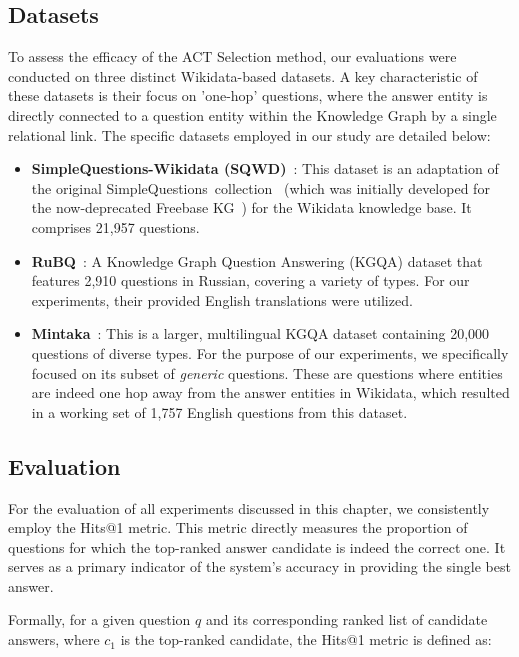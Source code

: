 \subsection{Datasets}
To assess the efficacy of the ACT Selection method, our evaluations were conducted on three distinct Wikidata-based datasets. A key characteristic of these datasets is their focus on 'one-hop' questions, where the answer entity is directly connected to a question entity within the Knowledge Graph by a single relational link. The specific datasets employed in our study are detailed below:
\begin{itemize}
    \item \textbf{SimpleQuestions-Wikidata (SQWD)}~\cite{SQ_WD}: This dataset is an adaptation of the original SimpleQuestions~collection~\cite{simplequestions} (which was initially developed for the now-deprecated Freebase KG~\cite{bollacker2008freebase}) for the Wikidata knowledge base. It comprises 21,957 questions.
    \item \textbf{RuBQ}~\cite{korablinov2020rubq,rybin2021rubq}: A Knowledge Graph Question Answering (KGQA) dataset that features 2,910 questions in Russian, covering a variety of types. For our experiments, their provided English translations were utilized.
    \item \textbf{Mintaka}~\cite{DBLP:conf/coling/SenAS22-mintaka}: This is a larger, multilingual KGQA dataset containing 20,000 questions of diverse types. For the purpose of our experiments, we specifically focused on its subset of \emph{generic} questions. These are questions where entities are indeed one hop away from the answer entities in Wikidata, which resulted in a working set of 1,757 English questions from this dataset.
\end{itemize}

\subsection{Evaluation}

For the evaluation of all experiments discussed in this chapter, we consistently employ the {Hits@1} metric. This metric directly measures the proportion of questions for which the top-ranked answer candidate is indeed the correct one. It serves as a primary indicator of the system's accuracy in providing the single best answer.

Formally, for a given question $q$ and its corresponding ranked list of candidate answers, where $c_1$ is the top-ranked candidate, the Hits@1 metric is defined as:

